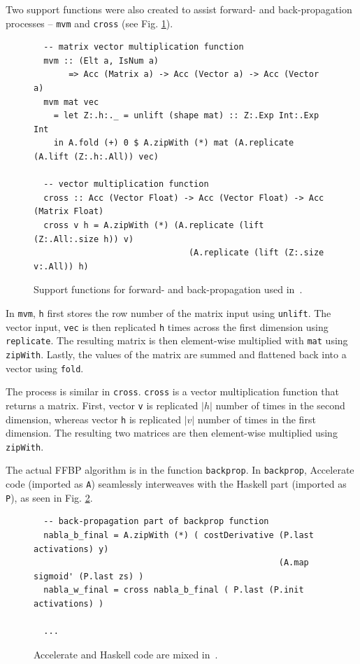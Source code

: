 Two support functions were also created to assist forward- and back-propagation processes -- \texttt{mvm} and \texttt{cross} (see Fig. \ref{fig:acc-functions3}).
\begin{figure}
\begin{lstlisting}
  -- matrix vector multiplication function
  mvm :: (Elt a, IsNum a)
       => Acc (Matrix a) -> Acc (Vector a) -> Acc (Vector a)
  mvm mat vec
    = let Z:.h:._ = unlift (shape mat) :: Z:.Exp Int:.Exp Int
    in A.fold (+) 0 $ A.zipWith (*) mat (A.replicate (A.lift (Z:.h:.All)) vec)
  
  -- vector multiplication function
  cross :: Acc (Vector Float) -> Acc (Vector Float) -> Acc (Matrix Float)
  cross v h = A.zipWith (*) (A.replicate (lift (Z:.All:.size h)) v)
                               (A.replicate (lift (Z:.size v:.All)) h)
\end{lstlisting}
  \caption{Support functions for forward- and back-propagation used in~\cite{Eve16}.}
  \label{fig:acc-functions3}
\end{figure}
In \texttt{mvm}, \texttt{h} first stores the row number of the matrix input using \texttt{unlift}. The vector input, \texttt{vec} is then replicated \texttt{h} times across the first dimension using \texttt{replicate}. The resulting matrix is then element-wise multiplied with \texttt{mat} using \texttt{zipWith}. Lastly, the values of the matrix are summed and flattened back into a vector using \texttt{fold}.

The process is similar in \texttt{cross}. \texttt{cross} is a vector multiplication function that returns a matrix. First, vector \texttt{v} is replicated $|h|$ number of times in the second dimension, whereas vector \texttt{h} is replicated $|v|$ number of times in the first dimension. The resulting two matrices are then element-wise multiplied using \texttt{zipWith}. 

The actual FFBP algorithm is in the function \texttt{backprop}. In \texttt{backprop}, Accelerate code (imported as \texttt{A}) seamlessly interweaves with the Haskell part (imported as \texttt{P}), as seen in Fig. \ref{fig:acc-functions4}.
\begin{figure}
  \begin{lstlisting}
  -- back-propagation part of backprop function
  nabla_b_final = A.zipWith (*) ( costDerivative (P.last activations) y) 
                                                 (A.map sigmoid' (P.last zs) )
  nabla_w_final = cross nabla_b_final ( P.last (P.init activations) )
  
  ...
  \end{lstlisting}
  \caption{Accelerate and Haskell code are mixed in~\cite{Eve16}.}
  \label{fig:acc-functions4}
\end{figure}

